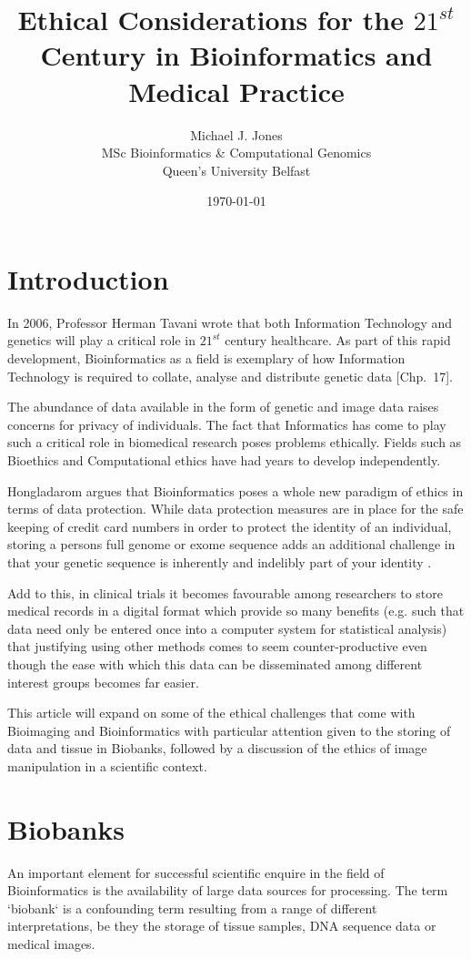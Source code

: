 \documentclass[british,a4paper, 12pt]{article}
\title{Ethical Considerations for the $21^{st}$ Century in Bioinformatics and Medical Practice}
\author{Michael J. Jones \\
  MSc Bioinformatics \& Computational Genomics \\
  Queen's University Belfast}
\date{\today}
\begin{document}
\maketitle
  
\section{Introduction}
In 2006, Professor Herman Tavani wrote that both Information Technology and
genetics will play a critical role in $21^{st}$ century healthcare. As part of
this rapid development, Bioinformatics as a field is exemplary of how
Information Technology is required to collate, analyse and distribute genetic
data \parencite{tavani2006ethics}[Chp.~17].

The abundance of data available in the form of genetic and image data raises
concerns for privacy of individuals. The fact that Informatics has come to
play such a critical role in biomedical research poses problems ethically.
Fields such as Bioethics and Computational ethics have had years to develop
independently.

Hongladarom argues that Bioinformatics poses a whole new paradigm of ethics in
terms of data protection. While data protection measures are in place for the
safe keeping of credit card numbers in order to protect the identity of an
individual, storing a persons full genome or exome sequence adds an additional
challenge in that your genetic sequence is inherently and indelibly part of
your identity \parencite{hongladarom2006ethics}.

Add to this, in clinical trials it becomes favourable among researchers to 
store medical records in a digital format which provide so many benefits (e.g. 
such that data need only be entered once into a computer system for statistical 
analysis) \parencite{parizel2011keep} that justifying using other methods comes to seem
counter-productive even though the ease with which this data can be disseminated among
different interest groups becomes far easier.

This article will expand on some of the ethical challenges that come with
Bioimaging and Bioinformatics with particular attention given to the storing
of data and tissue in Biobanks, followed by a discussion of the ethics of
image manipulation in a scientific context.

\section{Biobanks}
An important element for successful scientific enquire in the field of
Bioinformatics is the availability of large data sources for processing. The
term `biobank` is a confounding term resulting from a range of different
interpretations, be they the storage of tissue samples, DNA sequence data or
medical images.
\end{document}
